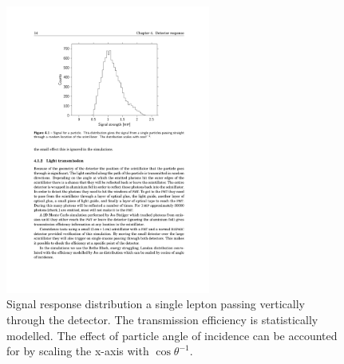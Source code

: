 \begin{figure}
    \centering
    \includegraphics[width=0.6\textwidth]
                    {plots/station/signal_response}
    \caption{Signal response distribution a single lepton passing vertically through the detector. The transmission efficiency is statistically modelled. The effect of particle angle of incidence can be accounted for by scaling the x-axis with $\cos{\theta}^{-1}$.}
    \label{fig:signal_response}
\end{figure}

